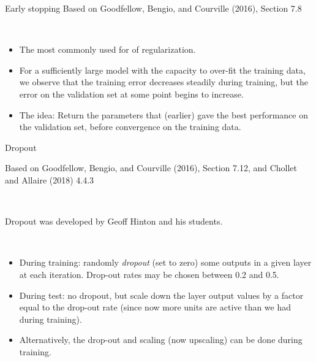 \documentclass[
  10pt,
  ignorenonframetext,
]{beamer}
\providecommand{\tightlist}{%
  \setlength{\itemsep}{0pt}\setlength{\parskip}{0pt}}
\begin{document}
\begin{frame}
\begin{block}{Early stopping}
\protect\hypertarget{early-stopping}{}
\tiny Based on Goodfellow, Bengio, and Courville (2016), Section 7.8

\normalsize

\(~\)

\begin{itemize}
\tightlist
\item
  The most commonly used for of regularization.
\end{itemize}

\vspace{2mm}

\begin{itemize}
\tightlist
\item
  For a sufficiently large model with the capacity to over-fit the
  training data, we observe that the training error decreases steadily
  during training, but the error on the validation set at some point
  begins to increase.
\end{itemize}

\vspace{2mm}

\begin{itemize}
\tightlist
\item
  The idea: Return the parameters that (earlier) gave the best
  performance on the validation set, before convergence on the training
  data.
\end{itemize}
\end{block}
\end{frame}

\begin{frame}
\begin{block}{Dropout}
\protect\hypertarget{dropout}{}
\tiny

Based on Goodfellow, Bengio, and Courville (2016), Section 7.12, and
Chollet and Allaire (2018) 4.4.3

\normalsize

\(~\)

Dropout was developed by Geoff Hinton and his students.

\(~\)

\begin{itemize}
\item
  During training: randomly \emph{dropout} (set to zero) some outputs in
  a given layer at each iteration. Drop-out rates may be chosen between
  0.2 and 0.5. \vspace{1mm}
\item
  During test: no dropout, but scale down the layer output values by a
  factor equal to the drop-out rate (since now more units are active
  than we had during training). \vspace{1mm}
\item
  Alternatively, the drop-out and scaling (now upscaling) can be done
  during training. \vspace{1mm}
\end{itemize}
\end{block}
\end{frame}
\end{document}
